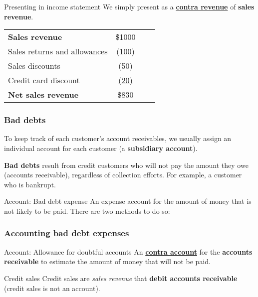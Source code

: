 \begin{knBox}
    {Presenting in income statement}
    We simply present as a \hyperref[def:contra]{\textbf{contra revenue}} of \textbf{sales revenue}.

    \begin{tabular}{lccc}
        \textbf{Sales revenue}             & \$1000           \\
        \quad Sales returns and allowances & (100)            \\
        \quad Sales discounts              & (50)             \\
        \quad Credit card discount         & \underline{(20)} \\
        \textbf{Net sales revenue}         & \$830            \\
    \end{tabular}
\end{knBox}

\subsubsection{Bad debts}

To keep track of each customer's account receivables, we usually assign an individual account for each customer (a \textbf{subsidiary account}).

\textbf{Bad debts} result from credit customers who will not pay the amount they owe (accounts receivable), regardless of collection efforts. For example, a customer who is bankrupt.

\begin{definition}
    {Account: Bad debt expense}
    An expense account for the amount of money that is not likely to be paid. There are two methods to do so:
\end{definition}


\subsubsection{Accounting bad debt expenses}

\begin{definition}
    {Account: Allowance for doubtful accounts}
    An \hyperref[def:contra]{\textbf{contra account}} for the \textbf{accounts receivable} to estimate the amount of money that will not be paid.
\end{definition}

\begin{theorem}
    {Credit sales}
    Credit sales are \textit{sales revenue} that \textbf{debit accounts receivable} (credit sales is not an account).
\end{theorem}


